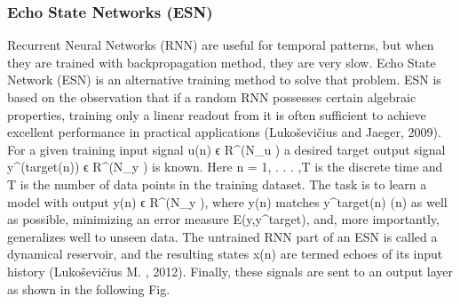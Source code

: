 \documentclass[review]{elsarticle}
\begin{document}
{{\subsubsection{Echo State Networks (ESN)}
Recurrent Neural Networks (RNN) are useful for temporal patterns, but when they are trained with backpropagation method, they are very slow.  Echo State Network (ESN) is an alternative training method to solve that problem.  ESN is based on the observation that if a random RNN possesses certain algebraic properties, training only a linear readout from it is often sufficient to achieve excellent performance in practical applications (Lukoševičius and Jaeger, 2009). 
For a given training input signal u(n)  ϵ R^(N_u ) a desired target output signal y^(target(n))  ϵ R^(N_y )
is known. Here n = 1, . . . ,T is the discrete time and T is the number of data points in the training dataset. The task is to learn a model with output y(n)  ϵ R^(N_y ), where y(n) matches y^target(n) (n) as well as possible, minimizing an error measure E(y,y^target), and, more importantly, generalizes well to unseen data. The untrained RNN part of an ESN is called a dynamical reservoir, and the resulting states x(n) are termed echoes of its input history
 (Lukoševičius M. , 2012). Finally, these signals are sent to an output layer as shown in the following Fig.
 
}}
\end{document}

